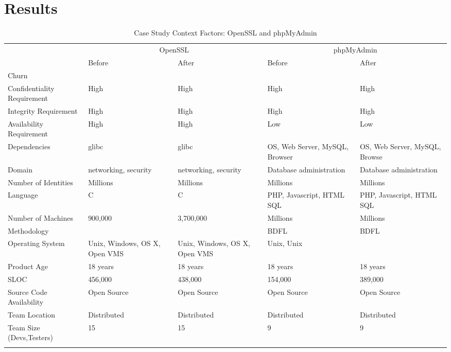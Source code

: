 \section{Results}
\label{sec:results}


\begin{table*}
	\begin{center}	
		\caption{Case Study Context Factors: OpenSSL and phpMyAdmin}
		\begin{tiny}	
			\begin{tabular}{|l|l|l||l|l|}
				\topline
				\headcol & \multicolumn{2}{c}{OpenSSL} & \multicolumn{2}{c}{phpMyAdmin}\\
				\headcol & Before & After & Before & After \\	
				\midline
				Churn & & & & \\
				Confidentiality Requirement & High & High & High  & High \\
				Integrity Requirement & High & High & High  & High \\
				Availability Requirement & High & High & Low  & Low \\
				Dependencies & glibc & glibc & OS, Web Server, MySQL, Browser &  OS, Web Server, MySQL, Browse \\
				Domain & networking, security & networking, security & Database administration & Database administration \\
				Number of Identities & Millions & Millions & Millions & Millions \\
				Language & C & C & PHP, Javascript, HTML SQL & PHP, Javascript, HTML SQL \\
				Number of Machines & 900,000 & 3,700,000 & Millions & Millions \\
				Methodology & & & BDFL & BDFL \\
				Operating System & Unix, Windows, OS X, Open VMS & Unix, Windows, OS X, Open VMS & Unix, Unix \\
				Product Age & 18 years & 18 years & 18 years & 18 years \\
				SLOC & 456,000 & 438,000 & 154,000 & 389,000 \\
				Source Code Availability &  Open Source &  Open Source &  Open Source &  Open Source \\
				Team Location & Distributed  & Distributed  & Distributed  & Distributed \\
				Team Size (Devs,Testers) & 15  & 15 & 9 & 9 \\
				\bottomline
			\end{tabular}
			
			\label{tab:CAO_SCTO_Table}
		\end{tiny}
	\end{center}
\end{table*}

